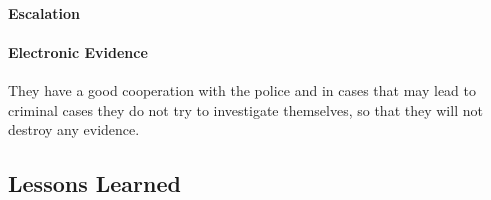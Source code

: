 \paragraph{Escalation}

\paragraph{Electronic Evidence}
They have a good cooperation with the police and in cases that may lead to criminal cases they do not try to investigate themselves, so that they will not destroy any evidence. %

\subsection{Lessons Learned}